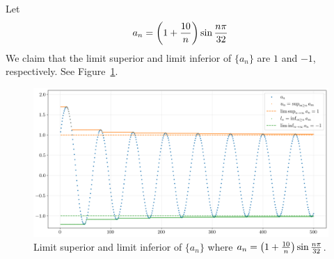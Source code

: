 \documentclass[thmcnt=section, 12pt]{my-elegantbook}
\begin{document}
\begin{example}
    Let
    \begin{align*}
        a_n = \left( 1 + \frac{10}{n} \right) \sin \frac{n \pi}{32}
    \end{align*}
    We claim that the limit superior and limit inferior of $\{a_n\}$ are $1$ and $-1$, respectively. See Figure~\ref{fig:12}.

    \begin{figure}[ht]
        \centering
        \includegraphics[scale=0.4]{figures/limsup-liminf.png}
        \caption{Limit superior and limit inferior of $\{a_n\}$ where $a_n = \left( 1 + \frac{10}{n} \right) \sin \frac{n \pi}{32}$.}
        \label{fig:12}
    \end{figure}


\end{example}
\end{document}
